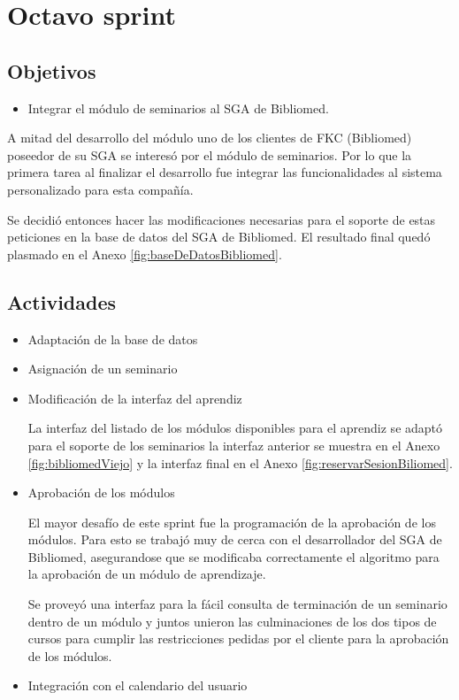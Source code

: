 \section{Octavo sprint} %
\label{sec:octavo_sprint}

\subsection{Objetivos}

\begin{itemize}
	\item Integrar el módulo de seminarios al SGA de Bibliomed.
\end{itemize}

A mitad del desarrollo del módulo uno de los clientes de FKC (Bibliomed) poseedor de su SGA se interesó por el módulo de seminarios. Por lo que la primera tarea al finalizar el desarrollo fue integrar las funcionalidades al sistema personalizado para esta compañía.

Se decidió entonces hacer las modificaciones necesarias para el soporte de estas peticiones en la base de datos del SGA de Bibliomed. El resultado final quedó plasmado en el Anexo \ref{fig:baseDeDatosBibliomed}.

\subsection{Actividades} %
\label{sub:actividades8}

\begin{itemize}

\item Adaptación de la base de datos

\item Asignación de un seminario

\item Modificación de la interfaz del aprendiz

La interfaz del listado de los módulos disponibles para el aprendiz se adaptó para el soporte de los seminarios la interfaz anterior se muestra en el Anexo \ref{fig:bibliomedViejo} y la interfaz final en el Anexo \ref{fig:reservarSesionBiliomed}.

\item Aprobación de los módulos

El mayor desafío de este sprint fue la programación de la aprobación de los módulos. Para esto se trabajó muy de cerca con el desarrollador del SGA de Bibliomed, asegurandose que se modificaba correctamente el algoritmo para la aprobación de un módulo de aprendizaje.

Se proveyó una interfaz para la fácil consulta de terminación de un seminario dentro de un módulo y juntos unieron las culminaciones de los dos tipos de cursos para cumplir las restricciones pedidas por el cliente para la aprobación de los módulos.

\item Integración con el calendario del usuario

\end{itemize}



